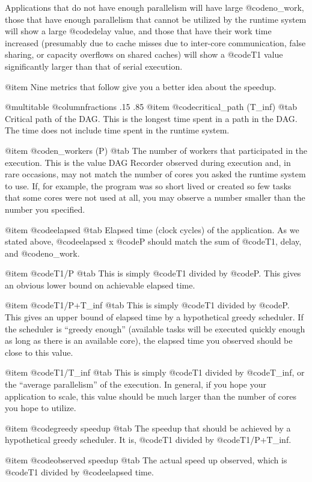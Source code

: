 Applications that do not have enough parallelism will have large
@code{no_work}, those that have enough parallelism that cannot
be utilized by the runtime system will show a large @code{delay} value,
and those that have their work time increased (presumably due to
cache misses due to inter-core communication, false sharing, or 
capacity overflows on shared caches) will show a @code{T1} value
significantly larger than that of serial execution.

@item Nine metrics that follow give you a better idea about the
speedup.

@multitable @columnfractions .15 .85
@item @code{critical_path (T_inf)} @tab Critical path of the DAG.  This
is the longest time spent in a path in the DAG.  The time does not
include time spent in the runtime system.

@item @code{n_workers (P)} @tab
The number of workers that participated in the execution.  This is
the value DAG Recorder observed during execution and, in rare occasions,
may not match the number of cores you asked the runtime system to use.
If, for example, the program was so short lived or created so few tasks
that some cores were not used at all, you may observe a number smaller than
the number you specified.

@item @code{elapsed} @tab
Elapsed time (clock cycles) of the application.
As we stated above, @code{elapsed} x @code{P} should match the sum
of @code{T1, delay,} and @code{no_work}.

@item @code{T1/P} @tab 
This is simply @code{T1} divided by @code{P}. 
This gives an obvious lower bound on achievable elapsed time.

@item @code{T1/P+T_inf} @tab
This is simply @code{T1} divided by @code{P}. 
This gives an upper bound of elapsed time by a hypothetical greedy
scheduler.  If the scheduler is ``greedy enough'' (available tasks
will be executed quickly enough as long as there is an available core),
the elapsed time you observed should be close to this value.

@item @code{T1/T_inf} @tab
This is simply @code{T1} divided by @code{T_inf}, 
or the ``average parallelism'' of the execution.  In general, if you
hope your application to scale, this value should be much larger than
the number of cores you hope to utilize.

@item @code{greedy speedup} @tab 
The speedup that should be achieved
by a hypothetical greedy scheduler.  It is, @code{T1} divided
by @code{T1/P+T_inf}.

@item @code{observed speedup} @tab 
The actual speed up observed,
which is @code{T1} divided by @code{elapsed time}.

